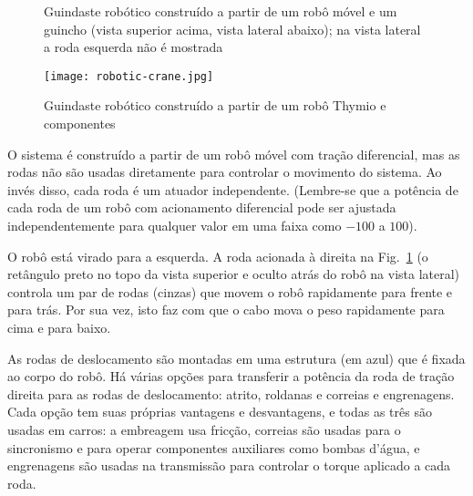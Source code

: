 \begin{figure}
\begin{center}
\caption{Guindaste robótico construído a partir de um robô móvel e um guincho (vista superior acima, vista lateral abaixo); na vista lateral a roda esquerda não é mostrada}\label{fig.act-dof}
\end{center}
\end{figure}

\begin{figure}
\begin{center}
\texttt{[image: robotic-crane.jpg]}
\caption{Guindaste robótico construído a partir de um robô Thymio e componentes \lego}\label{fig.crane}
\end{center}
\end{figure}

O sistema é construído a partir de um robô móvel com tração diferencial, mas as rodas não são usadas diretamente para controlar o movimento do sistema. Ao invés disso, cada roda é um atuador independente. (Lembre-se que a potência de cada roda de um robô com acionamento diferencial pode ser ajustada independentemente para qualquer valor em uma faixa como $-100$ a $100$).

O robô está virado para a esquerda. A roda acionada à direita na Fig.~\ref{fig.act-dof} (o retângulo preto no topo da vista superior e oculto atrás do robô na vista lateral) controla um par de rodas (cinzas) que movem o robô rapidamente para frente e para trás. Por sua vez, isto faz com que o cabo mova o peso rapidamente para cima e para baixo.

As rodas de deslocamento são montadas em uma estrutura (em azul) que é fixada ao corpo do robô. Há várias opções para transferir a potência da roda de tração direita para as rodas de deslocamento: atrito, roldanas e correias e engrenagens. Cada opção tem suas próprias vantagens e desvantagens, e todas as três são usadas em carros: a embreagem usa fricção, correias são usadas para o sincronismo e para operar componentes auxiliares como bombas d'água, e engrenagens são usadas na transmissão para controlar o torque aplicado a cada roda.

